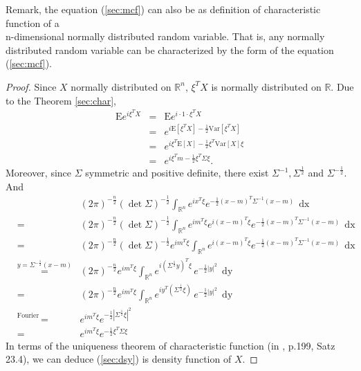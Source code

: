 \documentclass[a4paper, twoside, 11pt]{article}
\theoremstyle{definition}
\newcommand{\sqbr}[1]{\left[ {#1} \right]}
\begin{document}
  Remark, the equation (\ref{sec:mcf}) can also be as definition of characteristic function of a \\n-dimensional normally distributed random variable. That is, any normally distributed random variable can be characterized by the form of the equation (\ref{sec:mcf}).

  \begin{proof}
	Since $X$ normally distributed on $\mathbb{R}^{n}$,  $\xi^T X$ is normally distributed on $\mathbb{R}$. Due to the Theorem \ref{sec:char},
	\begin{eqnarray*}
	  \mathrm{E} e^{i\xi^T X} &=& \mathrm{E} e^{i\cdot 1 \cdot \xi^T X}\\
							  &=& e^{i\mathrm{E}\sqbr{\xi^T X} -\frac{1}{2}\mathrm{Var}\sqbr{\xi^T X}}\\
							  &=& e^{i\xi^T\mathrm{E}\sqbr{X} - \frac{1}{2}\xi^T \mathrm{Var}\sqbr{X} \xi}\\
							  &=& e^{i\xi^Tm - \frac{1}{2}\xi^T \Sigma \xi}.
	\end{eqnarray*}
	Moreover, since $\Sigma$ symmetric and positive definite, there exist $\Sigma^{-1}, \Sigma^{\frac{1}{2}}$ and $\Sigma^{-\frac{1}{2}}$. And
	\begin{eqnarray*}
	  &&(2\pi)^{-\frac{n}{2}} (\det\Sigma) ^{-\frac{1}{2}}\int_{\mathbb{R}^{n}} e^{i x^T \xi}e^{-\frac{1}{2}(x-m)^T\Sigma^{-1}(x-m)}\, \mathop{dx}\\
	  &=& (2\pi)^{-\frac{n}{2}} (\det\Sigma) ^{-\frac{1}{2}}\int_{\mathbb{R}^{n}} e^{im^T\xi} e^{i (x-m)^T \xi}e^{-\frac{1}{2}(x-m)^T\Sigma^{-1}(x-m)}\, \mathop{dx} \\
	  &=& (2\pi)^{-\frac{n}{2}} (\det\Sigma) ^{-\frac{1}{2}}  e^{im^T\xi} \int_{\mathbb{R}^{n}} e^{i (x-m)^T \xi}e^{-\frac{1}{2}(x-m)^T\Sigma^{-1}(x-m)}\, \mathop{dx} \\
	  &\overset{y=\Sigma^{-\frac{1}{2}}(x-m)}{=}& (2\pi)^{-\frac{n}{2}} e^{im^T\xi} \int_{\mathbb{R}^{n}}e^{i (\Sigma^{\frac{1}{2}}y)^T \xi}\,e^{-\frac{1}{2}|y|^2}\, \mathop{dy}\\
	  &=& (2\pi)^{-\frac{n}{2}} e^{im^T\xi}  \int_{\mathbb{R}^{n}}e^{i y^T (\Sigma^{\frac{1}{2}}\xi)}\,e^{-\frac{1}{2}|y|^2}\, \mathop{dy}\\
	  &\overset{\text{Fourier transformation}}{=}& e^{im^T\xi}  e^{-\frac{1}{2}|\Sigma^{\frac{1}{2}}\xi|^2}\\
	  &=& e^{im^T\xi}  e^{-\frac{1}{2}\xi^T\Sigma\xi}
	\end{eqnarray*}
	In terms of the uniqueness theorem of characteristic function (in \cite{bauer}, p.199, Satz 23.4), we can deduce (\ref{sec:dsy}) is density function of $X$.
  \end{proof}
\end{document}
